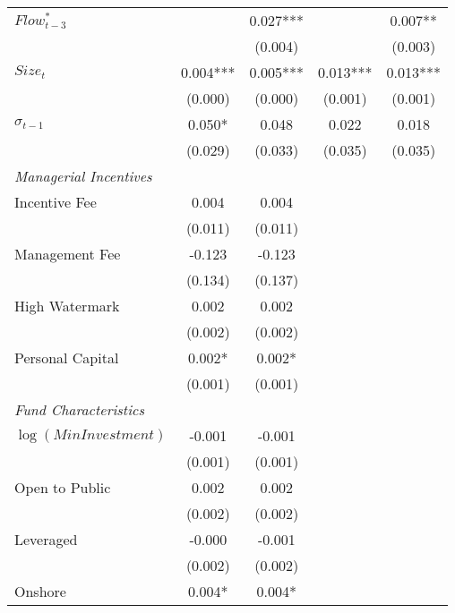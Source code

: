 {\begin{tabular}{l*{4}{c}}
$Flow^*_{t-3}$&               &       0.027***&               &       0.007** \\
&               &     (0.004)   &               &     (0.003)   \\
$Size_t$    &       0.004***&       0.005***&       0.013***&       0.013***\\
            &     (0.000)   &     (0.000)   &     (0.001)   &     (0.001)   \\
$\sigma_{t-1}$&       0.050*  &       0.048   &       0.022   &       0.018   \\
            &     (0.029)   &     (0.033)   &     (0.035)   &     (0.035)   \\
\hline
\textit{Managerial Incentives} & & & & \\
Incentive Fee&       0.004   &       0.004   &               &               \\
            &     (0.011)   &     (0.011)   &               &               \\
Management Fee&      -0.123   &      -0.123   &               &               \\
            &     (0.134)   &     (0.137)   &               &               \\
High Watermark&       0.002   &       0.002   &               &               \\
            &     (0.002)   &     (0.002)   &               &               \\
Personal Capital&       0.002*  &       0.002*  &               &               \\
            &     (0.001)   &     (0.001)   &               &               \\
\hline
\textit{Fund Characteristics} & & & & \\
$\log(Min Investment)$  &      -0.001   &      -0.001   &               &       \\
            &     (0.001)   &     (0.001)   &               &               \\
Open to Public&       0.002   &       0.002   &               &               \\
            &     (0.002)   &     (0.002)   &               &               \\
Leveraged   &      -0.000   &      -0.001   &               &               \\
            &     (0.002)   &     (0.002)   &               &               \\
Onshore     &       0.004*  &       0.004*  &               &               \\

\end{tabular}}
